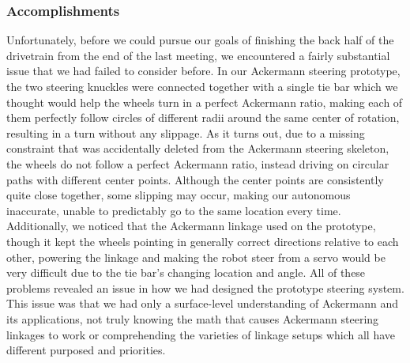 \subsubsection*{Accomplishments}
Unfortunately, before we could pursue our goals of finishing the back half of the drivetrain from the end of the last meeting, we encountered a fairly substantial issue that we had failed to consider before. In our Ackermann steering prototype, the two steering knuckles were connected together with a single tie bar which we thought would help the wheels turn in a perfect Ackermann ratio, making each of them perfectly follow circles of different radii around the same center of rotation, resulting in a turn without any slippage. As it turns out, due to a missing constraint that was accidentally deleted from the Ackermann steering skeleton, the wheels do not follow a perfect Ackermann ratio, instead driving on circular paths with different center points. Although the center points are consistently quite close together, some slipping may occur, making our autonomous inaccurate, unable to predictably go to the same location every time. Additionally, we noticed that the Ackermann linkage used on the prototype, though it kept the wheels pointing in generally correct directions relative to each other, powering the linkage and making the robot steer from a servo would be very difficult due to the tie bar’s changing location and angle. All of these problems revealed an issue in how we had designed the prototype steering system. This issue was that we had only a surface-level understanding of Ackermann and its applications, not truly knowing the math that causes Ackermann steering linkages to work or comprehending the varieties of linkage setups which all have different purposed and priorities. 
